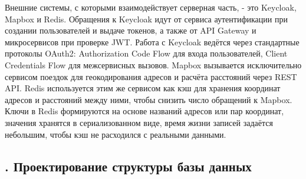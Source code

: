 {\par \redline Внешние системы, с которыми взаимодействует серверная часть, - это Keycloak, Mapbox и Redis. Обращения к Keycloak идут от сервиса аутентификации при создании пользователей и выдаче токенов, а также от API Gateway и микросервисов при проверке JWT. Работа с Keycloak ведётся через стандартные протоколы OAuth2: Authorization Code Flow для входа пользователей, Client Credentials Flow для межсервисных вызовов. Mapbox вызывается исключительно сервисом поездок для геокодирования адресов и расчёта расстояний через REST API. Redis используется этим же сервисом как кэш для хранения координат адресов и расстояний между ними, чтобы снизить число обращений к Mapbox. Ключи в Redis формируются на основе названий адресов или пар координат, значения хранятся в сериализованном виде, время жизни записей задаётся небольшим, чтобы кэш не расходился с реальными данными.
	
	\par
}

\titlespace

\subsection*{
	\gostTitleFont
	\redline
	\thechaptercntr .\thesubchaptercntr \spc
	Проектирование структуры базы данных
} \addtocounter{subchaptercntr}{1}

\titlespace

